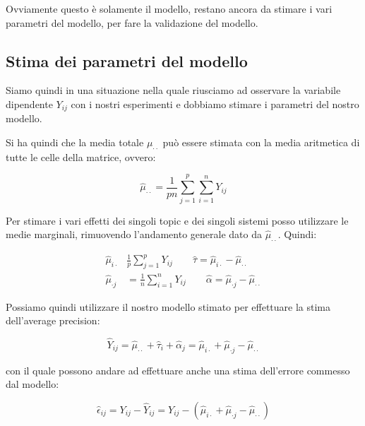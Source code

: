 Ovviamente questo è solamente il modello, restano ancora da stimare i vari parametri del modello, per fare la validazione del modello.

\subsection{Stima dei parametri del modello}

Siamo quindi in una situazione nella quale riusciamo ad osservare la variabile dipendente $Y_{ij}$ con i nostri esperimenti e dobbiamo stimare i parametri del nostro modello.

Si ha quindi che la media totale $\mu_{\cdot \cdot}$ può essere stimata con la media aritmetica di tutte le celle della matrice, ovvero:

$$
\hat{\mu}_{\cdot \cdot} = \frac{1}{pn}\sum\limits_{j=1}^{p}\sum\limits_{i=1}^{n} Y_{ij}
$$

Per stimare i vari effetti dei singoli topic e dei singoli sistemi posso utilizzare le medie marginali, rimuovendo l'andamento generale dato da $\hat{\mu}_{\cdot \cdot}$.
Quindi:

\begin{align*}
	\hat{\mu}_{i\cdot} & \frac{1}{p}\sum\limits_{j=1}^{p} Y_{ij} \qquad \hat{\tau} = \hat{\mu}_{i\cdot} - \hat{\mu}_{\cdot\cdot} \\
	\hat{\mu}_{\cdot j} &= \frac{1}{n}\sum\limits_{i=1}^{n} Y_{ij} \qquad \hat{\alpha} = \hat{\mu}_{\cdot j} - \hat{\mu}_{\cdot\cdot}
\end{align*}

Possiamo quindi utilizzare il nostro modello stimato per effettuare la stima dell'average precision:

$$
\hat{Y}_{ij} = \hat{\mu}_{\cdot\cdot} + \hat{\tau}_i + \hat{\alpha}_j = \hat{\mu}_{i\cdot} + \hat{\mu}_{\cdot j} - \hat{\mu}_{\cdot\cdot}
$$

con il quale possono andare ad effettuare anche una stima dell'errore commesso dal modello:

$$
\hat{\epsilon}_{ij} = Y_{ij} - \hat{Y}_{ij} = Y_{ij} - (\hat{\mu}_{i\cdot} + \hat{\mu}_{\cdot j} - \hat{\mu}_{\cdot\cdot})
$$








